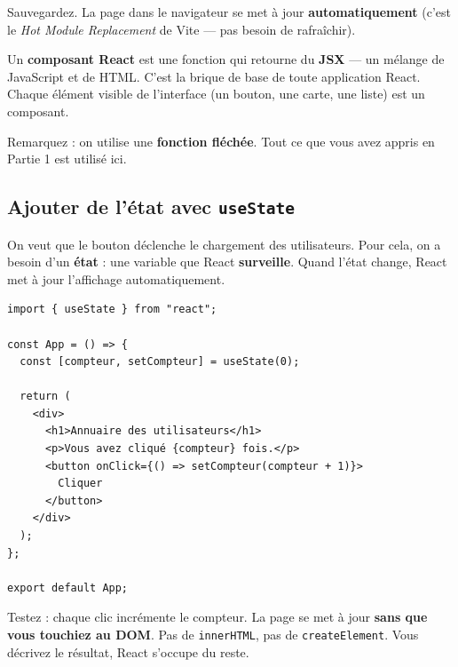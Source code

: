 \documentclass[11pt,a4paper]{article}
\begin{document}
Sauvegardez. La page dans le navigateur se met à jour \textbf{automatiquement} (c'est le \emph{Hot Module Replacement} de Vite --- pas besoin de rafraîchir).

\begin{infobox}
Un \textbf{composant React} est une fonction qui retourne du \textbf{JSX} --- un mélange de JavaScript et de HTML. C'est la brique de base de toute application React. Chaque élément visible de l'interface (un bouton, une carte, une liste) est un composant.

Remarquez : on utilise une \textbf{fonction fléchée}. Tout ce que vous avez appris en Partie 1 est utilisé ici.
\end{infobox}

\subsection{Ajouter de l'état avec \texttt{useState}}

On veut que le bouton déclenche le chargement des utilisateurs. Pour cela, on a besoin d'un \textbf{état} : une variable que React \textbf{surveille}. Quand l'état change, React met à jour l'affichage automatiquement.

\begin{lstlisting}
import { useState } from "react";

const App = () => {
  const [compteur, setCompteur] = useState(0);

  return (
    <div>
      <h1>Annuaire des utilisateurs</h1>
      <p>Vous avez cliqué {compteur} fois.</p>
      <button onClick={() => setCompteur(compteur + 1)}>
        Cliquer
      </button>
    </div>
  );
};

export default App;
\end{lstlisting}

Testez : chaque clic incrémente le compteur. La page se met à jour \textbf{sans que vous touchiez au DOM}. Pas de \texttt{innerHTML}, pas de \texttt{createElement}. Vous décrivez le résultat, React s'occupe du reste.
\end{document}
